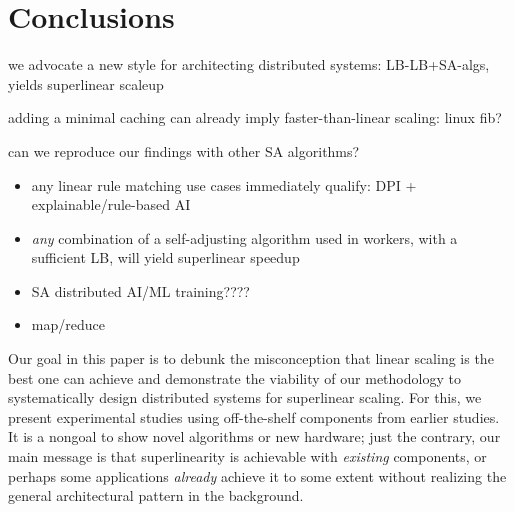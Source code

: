 \section{Conclusions}\label{sec:conclusions}

we advocate a new style for architecting distributed systems: LB-LB+SA-algs, yields superlinear scaleup

adding a minimal caching can already imply faster-than-linear scaling: linux fib? 

can we reproduce our findings with other SA algorithms?
\begin{itemize}
\item any linear rule matching use cases immediately qualify: DPI + explainable/rule-based AI
\item \emph{any} combination of a self-adjusting algorithm used in workers, with a sufficient LB, will yield superlinear speedup
\item SA distributed AI/ML training????
\item map/reduce
\end{itemize}


Our goal in this paper is to debunk the misconception that linear scaling is the best one can achieve and demonstrate the viability of our methodology to systematically design distributed systems for superlinear scaling. For this, we present experimental studies using off-the-shelf components from earlier studies. It is a nongoal to show novel algorithms or new hardware; just the contrary, our main message is that superlinearity is achievable with \emph{existing} components, or perhaps some applications \emph{already} achieve it to some extent without realizing the general architectural pattern in the background.



